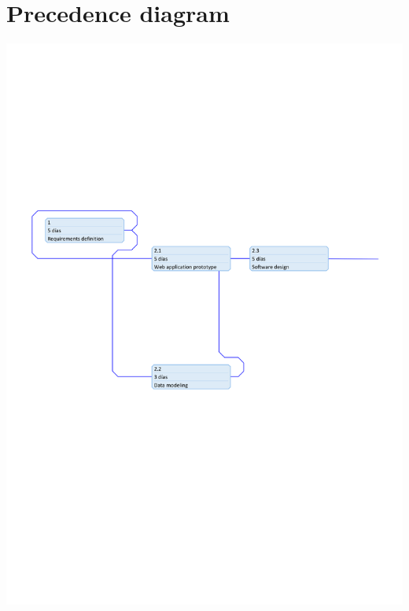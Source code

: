 \documentclass{DeustoFDP}
\begin{document}
\section{Precedence diagram}
\begin{center}
\includegraphics[width=0.9\linewidth]{fig/precedence-1}
\end{center}
\end{document}
